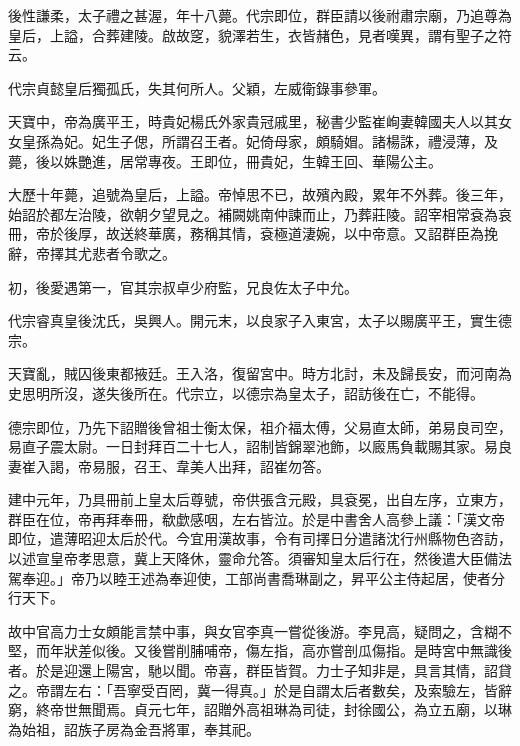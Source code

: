 \begin{pinyinscope}
 後性謙柔，太子禮之甚渥，年十八薨。代宗即位，群臣請以後祔肅宗廟，乃追尊為皇后，上謚，合葬建陵。啟故窆，貌澤若生，衣皆赭色，見者嘆異，謂有聖子之符云。



 代宗貞懿皇后獨孤氏，失其何所人。父穎，左威衛錄事參軍。



 天寶中，帝為廣平王，時貴妃楊氏外家貴冠戚里，秘書少監崔峋妻韓國夫人以其女女皇孫為妃。妃生子偲，所謂召王者。妃倚母家，頗騎媢。諸楊誅，禮浸薄，及薨，後以姝艷進，居常專夜。王即位，冊貴妃，生韓王回、華陽公主。



 大歷十年薨，追號為皇后，上謚。帝悼思不已，故殯內殿，累年不外葬。後三年，始詔於都左治陵，欲朝夕望見之。補闕姚南仲諫而止，乃葬莊陵。詔宰相常袞為哀冊，帝於後厚，故送終華廣，務稱其情，袞極道淒婉，以中帝意。又詔群臣為挽辭，帝擇其尤悲者令歌之。



 初，後愛遇第一，官其宗叔卓少府監，兄良佐太子中允。



 代宗睿真皇後沈氏，吳興人。開元末，以良家子入東宮，太子以賜廣平王，實生德宗。



 天寶亂，賊囚後東都掖廷。王入洛，復留宮中。時方北討，未及歸長安，而河南為史思明所沒，遂失後所在。代宗立，以德宗為皇太子，詔訪後在亡，不能得。



 德宗即位，乃先下詔贈後曾祖士衡太保，祖介福太傅，父易直太師，弟易良司空，易直子震太尉。一日封拜百二十七人，詔制皆錦翠池飾，以廄馬負載賜其家。易良妻崔入謁，帝易服，召王、韋美人出拜，詔崔勿答。



 建中元年，乃具冊前上皇太后尊號，帝供張含元殿，具袞冕，出自左序，立東方，群臣在位，帝再拜奉冊，欷歔感咽，左右皆泣。於是中書舍人高參上議：「漢文帝即位，遣薄昭迎太后於代。今宜用漢故事，令有司擇日分遣諸沈行州縣物色咨訪，以述宣皇帝孝思意，冀上天降休，靈命允答。須審知皇太后行在，然後遣大臣備法駕奉迎。」帝乃以睦王述為奉迎使，工部尚書喬琳副之，昇平公主侍起居，使者分行天下。



 故中官高力士女頗能言禁中事，與女官李真一嘗從後游。李見高，疑問之，含糊不堅，而年狀差似後。又後嘗削脯哺帝，傷左指，高亦嘗剖瓜傷指。是時宮中無識後者。於是迎還上陽宮，馳以聞。帝喜，群臣皆賀。力士子知非是，具言其情，詔貸之。帝謂左右：「吾寧受百罔，冀一得真。」於是自謂太后者數矣，及索驗左，皆辭窮，終帝世無聞焉。貞元七年，詔贈外高祖琳為司徒，封徐國公，為立五廟，以琳為始祖，詔族子房為金吾將軍，奉其祀。




\end{pinyinscope}

